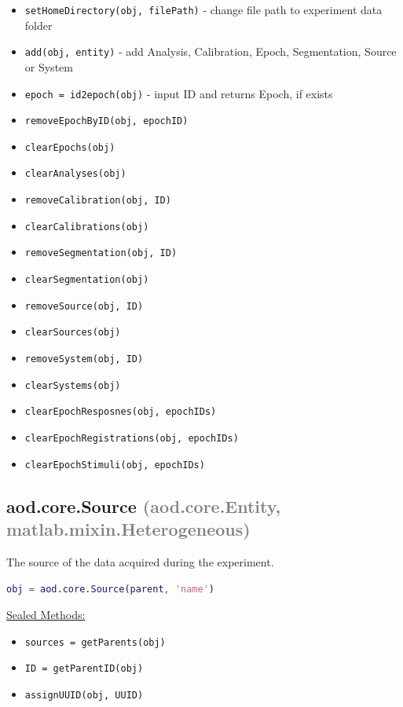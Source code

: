 \documentclass[10pt]{exam}
\newcommand\myparent[1]{\textcolor{gray}{(#1)}}
\newcommand\aodfcn[1]{\textcolor{darkteal}{\texttt{#1}}}
\newcommand\docheader[1]{\vspace{0.6ex}\noindent\underline{#1}\vspace{0.15ex}}
\begin{document}
		\begin{itemize}
			\item \aodfcn{setHomeDirectory(obj, filePath)} - change file path to experiment data folder
			\item \aodfcn{add(obj, entity)} - add Analysis, Calibration, Epoch, Segmentation, Source or System\\
			\item \aodfcn{epoch = id2epoch(obj)} - input ID and returns Epoch, if exists
			\item \aodfcn{removeEpochByID(obj, epochID)}
			\item \aodfcn{clearEpochs(obj)}\\
			\item \aodfcn{clearAnalyses(obj)}
			\item \aodfcn{removeCalibration(obj, ID)}
			\item \aodfcn{clearCalibrations(obj)}\\
			\item \aodfcn{removeSegmentation(obj, ID)}
			\item \aodfcn{clearSegmentation(obj)}\\
			\item \aodfcn{removeSource(obj, ID)}
			\item \aodfcn{clearSources(obj)}\\
			\item \aodfcn{removeSystem(obj, ID)}
			\item \aodfcn{clearSystems(obj)}\\
			\item \aodfcn{clearEpochResposnes(obj, epochIDs)}
			\item \aodfcn{clearEpochRegistrations(obj, epochIDs)}
			\item \aodfcn{clearEpochStimuli(obj, epochIDs)}
		\end{itemize}
	\subsection{aod.core.Source \myparent{aod.core.Entity, matlab.mixin.Heterogeneous}}
		\label{subsection:aod.core.Source}
		\noindent The source of the data acquired during the experiment. 
		\begin{lstlisting}[language=matlab]
obj = aod.core.Source(parent, 'name')
		\end{lstlisting}
		\docheader{Sealed Methods:}
		\begin{itemize}
			\item \aodfcn{sources = getParents(obj)}
			\item \aodfcn{ID = getParentID(obj)}
			\item \aodfcn{assignUUID(obj, UUID)}
		\end{itemize}
\end{document}
